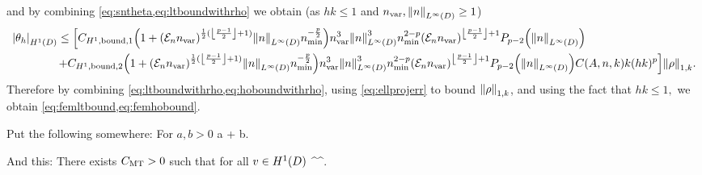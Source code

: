 and by combining \cref{eq:sntheta,eq:ltboundwithrho} we obtain (as $hk \leq 1$ and $\nvar,\NLiD{n} \geq 1$)
\begin{align}
\SNHoD{\thetah} &\leq
\mleft[\CHoboundo  \mleft(1+\mleft(\En\nvar\mright)^{\half(\floor{\frac{p-1}2}+1)}\NLiD{n}\nmin^{-\frac{p}2}\mright)\nvar^3\NLiD{n}^3\nmin^{2-p} \mleft(\En \nvar\mright)^{\floor{\frac{p-1}2}+1}\Pfn{p-2}\mleft(\NLiD{n}\mright)\mright.\nonumber\\
&\mleft.+\CHoboundt \mleft(1+\mleft(\En\nvar\mright)^{\half(\floor{\frac{p-1}2}+1)}\NLiD{n}\nmin^{-\frac{p}2}\mright)\nvar^3\NLiD{n}^3\nmin^{2-p} \mleft(\En \nvar\mright)^{\floor{\frac{p-1}2}+1} \Pfn{p-2}\mleft(\NLiD{n}\mright)\CAnk k(hk)^p\mright]\NW{\rho}.\label{eq:hoboundwithrho}
\end{align}
Therefore by combining \cref{eq:ltboundwithrho,eq:hoboundwithrho}, using \cref{eq:ellprojerr} to bound $\NW{\rho}$, and using the fact that $hk \leq 1,$ we obtain \cref{eq:femltbound,eq:femhobound}.
\epf


Put the following somewhere:
For $a,b > 0$
\beq\label{eq:simple}
 \leq a + b.
\eeq

And this:
\label{thm:multiplicativetrace}%
There exists $C_{\mathrm{MT}} > 0$ such that for all $v \in \HoD$
\beqs
{} \leq \CMT {}^\half {}^\half.
\eeqs
\enth
